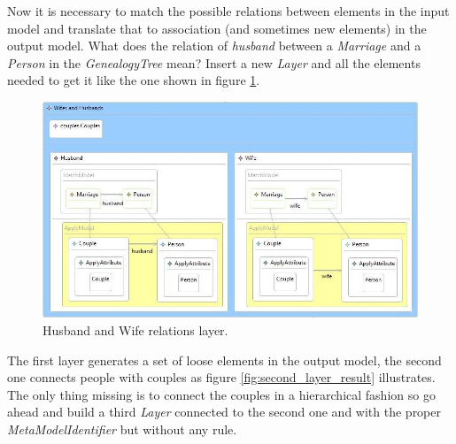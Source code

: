 Now it is necessary to match the possible relations between elements in the
input model and translate that to association (and sometimes new elements) in
the output model. What does the relation of \emph{husband} between a \emph{Marriage}
and a \emph{Person} in the \emph{GenealogyTree} mean? Insert a new \emph{Layer}
and all the elements needed to get it like the one shown in figure
\ref{fig:second_layers_relations}.

\begin{figure}[h]
\begin{center}
  \includegraphics[width=\textwidth]{imgs/second_layers_relations.jpg}
  \caption{Husband and Wife relations layer.}
  \label{fig:second_layers_relations}
\end{center}
\end{figure}

The first layer generates a set of loose elements in the output model, the
second one connects people with couples as figure \ref{fig:second_layer_result}
illustrates. The only thing missing is to connect the couples in a hierarchical
fashion so go ahead and build a third \emph{Layer} connected to the second one
and with the proper \emph{MetaModelIdentifier} but without any rule.

